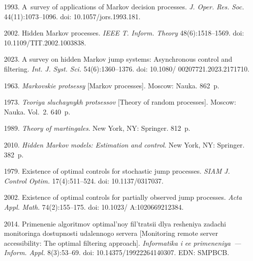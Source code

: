   \begin{multicols}{2}

\renewcommand{\bibname}{\protect\rmfamily References}

{\small\frenchspacing
 {%
 \begin{thebibliography}{99} 

 1993.
A~survey of applications of Markov decision processes. \textit{J. Oper. Res. 
Soc.} 44(11):1073--1096.
doi: 10.1057/jors.1993.181.

 2002.
Hidden Markov processes. \textit{IEEE T. Inform. Theory} 48(6):1518--1569. 
doi: 10.1109/TIT.2002.1003838.

 2023.
A survey on hidden Markov jump systems: Asynchronous control and filtering. 
\textit{Int. J. Syst. Sci.} 54(6):1360--1376.
doi: 10.1080/ 00207721.2023.2171710.

 1963. \textit{Markovskie protsessy} [Markov processes]. Moscow: 
Nauka. 862~p.

 1973. 
\textit{Teoriya sluchaynykh protsessov} [Theory of random processes]. Moscow: 
Nauka. Vol.~2. 640~p.

 1989. \textit{Theory of martingales}. New 
York, NY: Springer. 812~p.



 2010. 
\textit{Hidden Markov models: Estimation and control}. New York, NY: Springer. 
382~p.

 1979. 
Existence of optimal controls for stochastic jump processes. 
\textit{SIAM J. Control Optim.} 17(4):511--524.
doi: 10.1137/0317037.

 2002. 
Existence of optimal controls for partially observed jump processes. 
\textit{Acta Appl. Math.} 74(2):155--175.
doi: 10.1023/ A:1020669212384.

 2014. 
Primenenie algoritmov optimal'noy fil'tratsii dlya resheniya zadachi 
monitoringa dostupnosti udalennogo servera [Monitoring remote server 
accessibility: The optimal filtering approach]. 
\textit{Informatika i ee primeneniya~--- Inform. Appl.} 8(3):53--69. doi: 
10.14375/19922264140307. EDN: SMPBCB.


\end{thebibliography}}}
\end{multicols}
